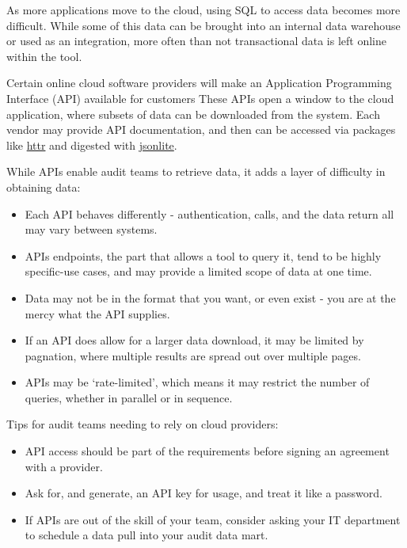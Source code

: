 \documentclass[
]{book}
\providecommand{\tightlist}{%
  \setlength{\itemsep}{0pt}\setlength{\parskip}{0pt}}
\begin{document}
As more applications move to the cloud, using SQL to access data becomes more difficult. While some of this data can be brought into an internal data warehouse or used as an integration, more often than not transactional data is left online within the tool.

Certain online cloud software providers will make an Application Programming Interface (API) available for customers These APIs open a window to the cloud application, where subsets of data can be downloaded from the system. Each vendor may provide API documentation, and then can be accessed via packages like \href{https://cran.r-project.org/web/packages/httr/index.html}{httr} and digested with \href{https://cran.r-project.org/web/packages/jsonlite/index.html}{jsonlite}.

While APIs enable audit teams to retrieve data, it adds a layer of difficulty in obtaining data:

\begin{itemize}
\tightlist
\item
  Each API behaves differently - authentication, calls, and the data return all may vary between systems.
\item
  APIs endpoints, the part that allows a tool to query it, tend to be highly specific-use cases, and may provide a limited scope of data at one time.
\item
  Data may not be in the format that you want, or even exist - you are at the mercy what the API supplies.
\item
  If an API does allow for a larger data download, it may be limited by pagnation, where multiple results are spread out over multiple pages.
\item
  APIs may be `rate-limited', which means it may restrict the number of queries, whether in parallel or in sequence.
\end{itemize}

Tips for audit teams needing to rely on cloud providers:

\begin{itemize}
\tightlist
\item
  API access should be part of the requirements before signing an agreement with a provider.
\item
  Ask for, and generate, an API key for usage, and treat it like a password.
\item
  If APIs are out of the skill of your team, consider asking your IT department to schedule a data pull into your audit data mart.
\end{itemize}
\end{document}
